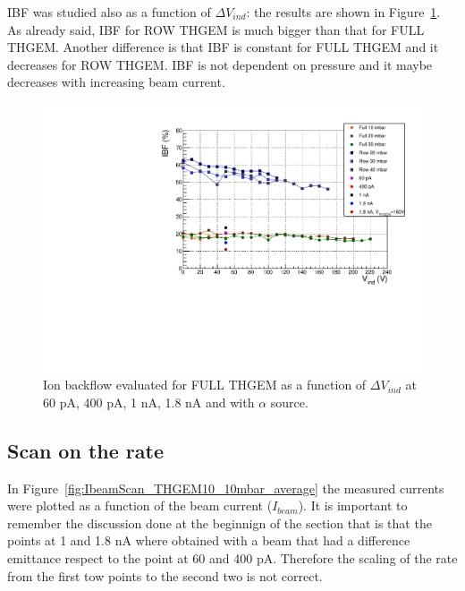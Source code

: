 \documentclass[a4paper, 11 pt]{report}
\newcommand{\Vind}{$\Delta V_{ind}$}
\newcommand{\ibeam}{$I_{beam}$}
\begin{document}
IBF was studied also as a function of \Vind: the results are shown in Figure~\ref{fig:IBFvsInd_beam}. 
As already said, IBF for ROW THGEM is much bigger than that for FULL THGEM. Another difference is 
that IBF is constant for FULL THGEM and it decreases for ROW THGEM. IBF is not dependent on 
pressure and it maybe decreases with increasing beam current.

\begin{figure}[!t]
	\centering
	\includegraphics[width=\textwidth]{Immagini/IBFvsInd_beam.pdf}
	\caption{Ion backflow evaluated for FULL THGEM as a function of \Vind{} at 60 pA, 400 pA, 1 nA, 
	1.8 nA and with $\alpha$ source.}
	\label{fig:IBFvsInd_beam}
\end{figure}


\subsection{Scan on the rate}

In Figure~\ref{fig:IbeamScan_THGEM10_10mbar_average} the measured currents were plotted as a function of the beam current (\ibeam). 
It is important to remember the discussion done at the beginnign of the section
that is that the points at 1 and 1.8 nA where obtained with a beam that had
a difference emittance respect to the point at 60 and 400 pA.
Therefore the scaling of the rate from the first tow points to the second two is not correct.
\end{document}
